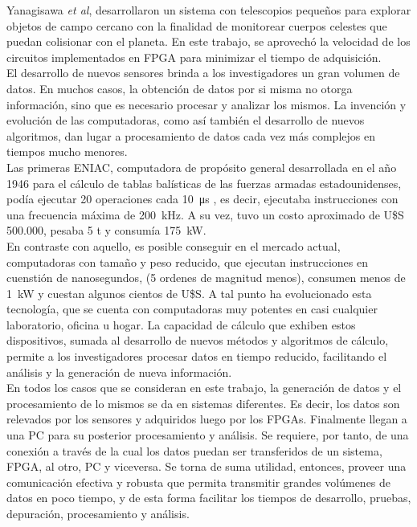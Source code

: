 Yanagisawa {\it et al}, desarrollaron un sistema con telescopios pequeños para explorar objetos de campo cercano con la finalidad de monitorear cuerpos celestes que puedan colisionar con el planeta\cite{Yanagisawa2018}. En este trabajo, se aprovechó la velocidad de los circuitos implementados en FPGA para minimizar el tiempo de adquisición.\\

El desarrollo de nuevos sensores brinda a los investigadores un gran volumen de datos. En muchos casos, la obtención de datos por si misma no otorga información, sino que es necesario procesar y analizar los mismos. La invención y evolución de las computadoras, como así también el desarrollo de nuevos algoritmos, dan lugar a procesamiento de datos cada vez más complejos en tiempos mucho menores.\\

Las primeras ENIAC, computadora de propósito general desarrollada en el año 1946 para el cálculo de tablas balísticas de las fuerzas armadas estadounidenses, podía ejecutar 20 operaciones cada \SI{10}{\micro\second} \cite{Goldstine1946}, es decir, ejecutaba instrucciones con una frecuencia máxima de \SI{200}{\kilo\hertz}. A su vez, tuvo un costo aproximado de U\$S 500.000, pesaba 5 t y consumía \SI{175}{\kilo\watt}.\\

En contraste con aquello, es posible conseguir en el mercado actual, computadoras con tamaño y peso reducido, que ejecutan instrucciones en cuenstión de nanosegundos, (5 ordenes de magnitud menos), consumen menos de \SI{1}{\kilo\watt} y cuestan algunos cientos de U\$S. A tal punto ha evolucionado esta tecnología, que se cuenta con computadoras muy potentes en casi cualquier laboratorio, oficina u hogar. La capacidad de cálculo que exhiben estos dispositivos, sumada al desarrollo de nuevos métodos y algoritmos de cálculo, permite a los investigadores procesar datos en tiempo reducido, facilitando el análisis y la generación de nueva información.\\

En todos los casos que se consideran en este trabajo, la generación de datos y el procesamiento de lo mismos se da en sistemas diferentes. Es decir, los datos son relevados por los sensores y adquiridos luego por los FPGAs. Finalmente llegan a una PC para su posterior procesamiento y análisis. Se requiere, por tanto, de una conexión a través de la cual los datos puedan ser transferidos de un sistema, FPGA, al otro, PC y viceversa. Se torna de suma utilidad, entonces, proveer una comunicación efectiva y robusta que permita transmitir grandes volúmenes de datos en poco tiempo, y de esta forma facilitar los tiempos de desarrollo, pruebas, depuración, procesamiento y análisis.\\

